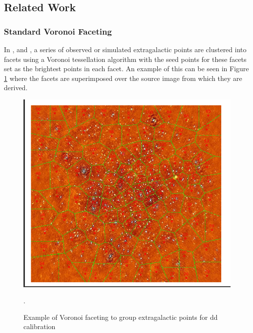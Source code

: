 \subsection{Related Work}\label{ra:sec:rw}
%
\subsubsection{Standard Voronoi Faceting}\label{ra:ssec:svf}
In \citep{tasse2014applying}, \citep{smirnov2015radio} and \citep{van2016lofar}, a series of observed or simulated extragalactic points are clustered into facets using a Voronoi tessellation algorithm with the seed points for these facets set as the brightest points in each facet. An example of this can be seen in Figure \ref{tes:fig:stelvor} where the facets are superimposed over the source image from which they are derived.
%
\begin{figure}[H]
    \centering
    \includegraphics[scale=0.4]{Images/tessellation.png}
    \caption{Example of Voronoi faceting to group extragalactic points for \gls{dd} calibration}.
    \label{tes:fig:stelvor}
\end{figure}
